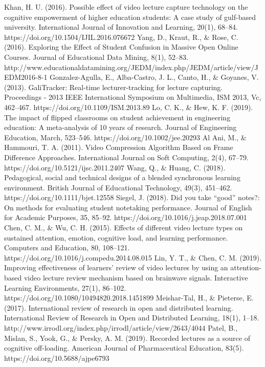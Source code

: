 \documentclass[conference]{IEEEtran}
\begin{document}
\begin{thebibliography}{00}
Khan, H. U. (2016). Possible effect of video lecture capture technology on the cognitive empowerment of higher education students: A case study of gulf-based university. International Journal of Innovation and Learning, 20(1), 68–84. https://doi.org/10.1504/IJIL.2016.076672
Yang, D., Kraut, R., \& Rose, C. (2016). Exploring the Effect of Student Confusion in Massive Open Online Courses. Journal of Educational Data Mining, 8(1), 52–83. http://www.educationaldatamining.org/JEDM/index.php/JEDM/article/view/JEDM2016-8-1
Gonzalez-Agulla, E., Alba-Castro, J. L., Canto, H., \& Goyanes, V. (2013). GaliTracker: Real-time lecturer-tracking for lecture capturing. Proceedings - 2013 IEEE International Symposium on Multimedia, ISM 2013, Vc, 462–467. https://doi.org/10.1109/ISM.2013.89
Lo, C. K., \& Hew, K. F. (2019). The impact of flipped classrooms on student achievement in engineering education: A meta-analysis of 10 years of research. Journal of Engineering Education, March, 523–546. https://doi.org/10.1002/jee.20293
Al Ani, M., \& Hammouri, T. A. (2011). Video Compression Algorithm Based on Frame Difference Approaches. International Journal on Soft Computing, 2(4), 67–79. https://doi.org/10.5121/ijsc.2011.2407
Wang, Q., \& Huang, C. (2018). Pedagogical, social and technical designs of a blended synchronous learning environment. British Journal of Educational Technology, 49(3), 451–462. https://doi.org/10.1111/bjet.12558
Siegel, J. (2018). Did you take “good” notes?: On methods for evaluating student notetaking performance. Journal of English for Academic Purposes, 35, 85–92. https://doi.org/10.1016/j.jeap.2018.07.001
Chen, C. M., \& Wu, C. H. (2015). Effects of different video lecture types on sustained attention, emotion, cognitive load, and learning performance. Computers and Education, 80, 108–121. https://doi.org/10.1016/j.compedu.2014.08.015
Lin, Y. T., \& Chen, C. M. (2019). Improving effectiveness of learners’ review of video lectures by using an attention-based video lecture review mechanism based on brainwave signals. Interactive Learning Environments, 27(1), 86–102. https://doi.org/10.1080/10494820.2018.1451899
Meishar-Tal, H., \& Pieterse, E. (2017). International review of research in open and distributed learning. International Review of Research in Open and Distributed Learning, 18(1), 1–18. http://www.irrodl.org/index.php/irrodl/article/view/2643/4044
Patel, B., Mislan, S., Yook, G., \& Persky, A. M. (2019). Recorded lectures as a source of cognitive off-loading. American Journal of Pharmaceutical Education, 83(5). https://doi.org/10.5688/ajpe6793

\end{thebibliography}
\end{document}
